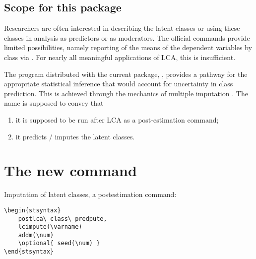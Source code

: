 \subsection{Scope for this package}

Researchers are often interested in describing the latent classes
or using these classes in analysis as predictors or as moderators.
The official  commands provide
limited possibilities, namely reporting of the means
of the dependent variables by class via .
For nearly all meaningful applications of LCA, this is insufficient.

The program distributed with the current package,
, provides a pathway for the appropriate
statistical inference that would account for uncertainty in class prediction.
This is achieved through the mechanics of multiple imputation
\citep{vanbuuren:2018:fimd2}. 
The name is supposed to convey that
\begin{enumerate}
  \item it is supposed to be run after LCA as a post-estimation command;
  \item it predicts / imputes the latent classes.
\end{enumerate}

\section{The new command}

Imputation of latent classes, a  postestimation command:

\begin{stverbatim}
\begin{verbatim}
\begin{stsyntax}
    postlca\_class\_predpute,
    lcimpute(\varname)
    addm(\num)
    \optional{ seed(\num) }
\end{stsyntax}
\end{verbatim}
\end{stverbatim}




